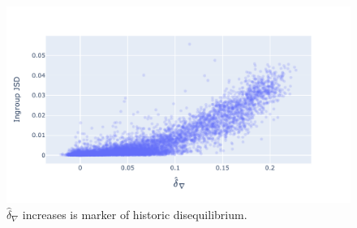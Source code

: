 \begin{figure}[!ht]
\centering
\includegraphics[width=\textwidth]{figures/plots/microbial/d-conv-JSD.pdf}
\caption{$\hat\delta_\nabla$ increases is marker of historic disequilibrium.}
\label{fig:microbial/d-conv/JSD}
\end{figure}